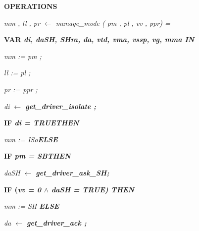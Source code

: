 \documentclass[11pt]{article}
\begin{document}
\begin{sloppypar}
\vspace*{8mm}
\bf OPERATIONS

\hspace*{0.15in}\it mm \rm , \it ll \rm , \it pr  $\leftarrow$  \it manage\_mode \rm ( \it pm \rm , \it pl \rm , \it vv \rm , \it ppr\rm ) \rm =

\hspace*{0.15in}\bf VAR \it di\rm , \it daSH\rm , \it SHra\rm , \it da\rm , \it vtd\rm , \it vma\rm , \it vssp\rm , \it vg\rm , \it mma \bf IN

\hspace*{0.35in}\it mm \rm := \it pm \rm ;

\hspace*{0.35in}\it ll \rm := \it pl \rm ;

\hspace*{0.35in}\it pr \rm := \it ppr \rm ;

\hspace*{0.10in}

\hspace*{0.35in}\it di  $\leftarrow$  \bf get\_driver\_isolate \rm ;

\hspace*{0.35in}\bf IF \it di \rm = \bf TRUE\hspace*{0.10in}\hspace*{0.35in}\bf THEN

\hspace*{0.55in}\it mm \rm := \it ISo\hspace*{0.10in}\hspace*{0.35in}\bf ELSE

\hspace*{0.55in}\hspace*{0.55in}\bf IF \it pm \rm = \it SB\hspace*{0.10in}\hspace*{0.55in}\bf THEN

\hspace*{0.75in}\it daSH\hspace*{0.10in} $\leftarrow$  \bf get\_driver\_ask\_SH\rm ;

\hspace*{0.75in}\bf IF \rm (\it vv \rm = \rm 0  $\land$  \it daSH \rm = \bf TRUE\rm ) \hspace*{0.75in}\bf THEN

\hspace*{0.95in}\it mm \rm := \it SH \hspace*{0.75in}\bf ELSE

\hspace*{0.95in}\hspace*{0.95in}\it da\hspace*{0.10in} $\leftarrow$  \bf get\_driver\_ack \rm ;


\end{sloppypar}
\end{document}
